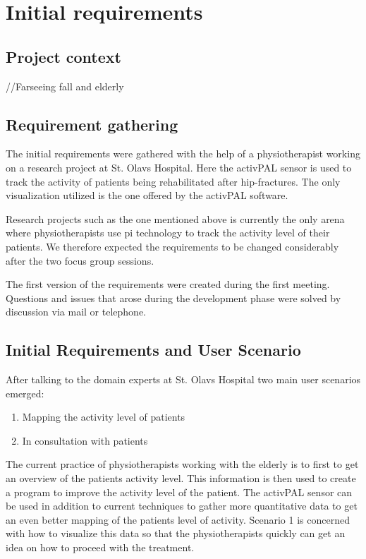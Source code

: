 \chapter{Initial requirements}

\section{Project context}
//Farseeing fall and elderly


\section{Requirement gathering}
The initial requirements were gathered with the help of a physiotherapist working on a research project at St. Olavs Hospital. Here the activPAL sensor is used to track the activity of patients being rehabilitated after hip-fractures. The only visualization utilized is the one offered by the activPAL software.

Research projects such as the one mentioned above is currently the only arena where physiotherapists use \gls{pi} technology to track the activity level of their patients. We therefore expected the requirements to be changed considerably after the two focus group sessions. 

The first version of the requirements were created during the first meeting. Questions and issues that arose during the development phase were solved by discussion via mail or telephone.

\section{Initial Requirements and User Scenario}
After talking to the domain experts at St. Olavs Hospital two main user scenarios emerged:
\vspace{-3mm}
\begin{enumerate}[itemsep=0cm, parsep=0cm]
  \item Mapping the activity level of patients
  \item In consultation with patients
\end{enumerate}

The current practice of physiotherapists working with the elderly is to first to get an overview of the patients activity level. This information is then used to create a program to improve the activity level of the patient. The activPAL sensor can be used in addition to current techniques to gather more quantitative data to get an even better mapping of the patients level of activity. Scenario 1 is concerned with how to visualize this data so that the physiotherapists quickly can get an idea on how to proceed with the treatment.

